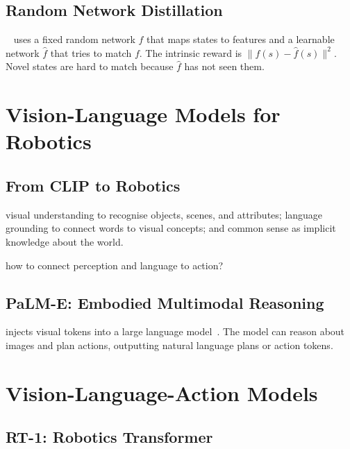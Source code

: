 \subsection{Random Network Distillation}

~\cite{Burda2019RND} uses a fixed random network $f$ that maps states to features and a learnable network $\hat{f}$ that tries to match $f$. The intrinsic reward is $\|f(s) - \hat{f}(s)\|^2$. Novel states are hard to match because $\hat{f}$ has not seen them.


\section{Vision-Language Models for Robotics}


\subsection{From CLIP to Robotics}

 visual understanding to recognise objects, scenes, and attributes; language grounding to connect words to visual concepts; and common sense as implicit knowledge about the world.

 how to connect perception and language to action?

\subsection{PaLM-E: Embodied Multimodal Reasoning}

 injects visual tokens into a large language model~\cite{Driess2023PaLME}. The model can reason about images and plan actions, outputting natural language plans or action tokens.


\section{Vision-Language-Action Models}


\subsection{RT-1: Robotics Transformer}

